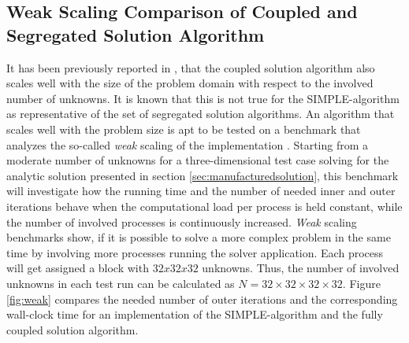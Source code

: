 \subsection{Weak Scaling Comparison of Coupled and Segregated Solution Algorithm}
\label{sec:weakscaling}

It has been previously reported in \cite{darwish09,vakilipour12}, that the coupled solution algorithm also scales well with the size of the problem domain with respect to the involved number of unknowns. It is known that this is not true for the SIMPLE-algorithm as representative of the set of segregated solution algorithms. An algorithm that scales well with the problem size is apt to be tested on a benchmark that analyzes the so-called \emph{weak} scaling of the implementation \cite{hager11}. Starting from a moderate number of unknowns for a three-dimensional test case solving for the analytic solution presented in section \ref{sec:manufacturedsolution}, this benchmark will investigate how the running time and the number of needed inner and outer iterations behave when the computational load per process is held constant, while the number of involved processes is continuously increased. \emph{Weak} scaling benchmarks show, if it is possible to solve a more complex problem in the same time by involving more processes running the solver application. Each process will get assigned a block with \(32x32x32\) unknowns. Thus, the number of involved unknowns in each test run can be calculated as \( N = 32\times32\times32\times32 \). Figure \ref{fig:weak} compares the needed number of outer iterations and the corresponding wall-clock time for an implementation of the SIMPLE-algorithm and the fully coupled solution algorithm.

